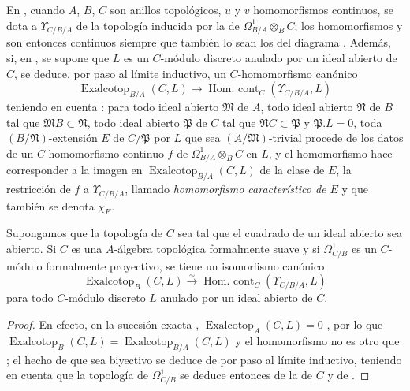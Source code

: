 \begin{env}[20.7.10]
\label{0.20.7.10-fr}
En , cuando $A$, $B$, $C$ son anillos topológicos,
$u$ y $v$ homomorfismos continuos, se dota a $\Upsilon_{C/B/A}$ de la
topología inducida por la de $\Omega^1_{B/A}\otimes_B C$; los
homomorfismos  y  son entonces
continuos siempre que también lo sean los del diagrama
. Además, si, en , se supone que
$L$ es un $C$-módulo discreto anulado por un ideal abierto de $C$, se deduce,
por paso al límite inductivo, un $C$-homomorfismo canónico
\begin{equation}
\tag{20.7.10.1}
\label{0.20.7.10.1-fr}
  \operatorname{Exalcotop}_{B/A}(C,L)\to
  \operatorname{Hom.\ cont}_C(\Upsilon_{C/B/A},L)
\end{equation}
teniendo en cuenta : para todo ideal abierto
$\mathfrak{M}$ de $A$, todo ideal abierto $\mathfrak{N}$ de $B$ tal que
$\mathfrak{M}B\subset\mathfrak{N}$, todo ideal abierto $\mathfrak{P}$ de $C$
tal que $\mathfrak{N}C\subset\mathfrak{P}$ y $\mathfrak{P}.L=0$, toda
$(B/\mathfrak{N})$-extensión $E$ de $C/\mathfrak{P}$ por $L$ que sea
$(A/\mathfrak{M})$-trivial procede de los datos de un $C$-homomorfismo
continuo $f$ de $\Omega^1_{B/A}\otimes_B C$ en $L$, y el homomorfismo
 hace corresponder a la imagen en
$\operatorname{Exalcotop}_{B/A}(C,L)$ de la clase de $E$, la restricción de
$f$ a $\Upsilon_{C/B/A}$, llamado \emph{homomorfismo característico de $E$}
y que también se denota $\chi_E$.
\end{env}

\begin{proposition}[20.7.11]
\label{0.20.7.11-fr}
Supongamos que la topología de $C$ sea tal que el cuadrado de un ideal abierto
sea abierto. Si $C$ es una $A$-álgebra topológica formalmente suave y si
$\Omega^1_{C/B}$ es un $C$-módulo formalmente proyectivo, se tiene un
isomorfismo canónico
\begin{equation}
\tag{20.7.11.1}
\label{0.20.7.11.1-fr}
  \operatorname{Exalcotop}_B(C,L)\xrightarrow{\sim}
  \operatorname{Hom.\ cont}_C(\Upsilon_{C/B/A},L)
\end{equation}
para todo $C$-módulo discreto $L$ anulado por un ideal abierto de $C$.
\end{proposition}

\begin{proof}
En efecto, en la sucesión exacta ,
$\operatorname{Exalcotop}_A(C,L)=0$ , por lo que
$\operatorname{Exalcotop}_B(C,L)=\operatorname{Exalcotop}_{B/A}(C,L)$ y
el homomorfismo  no es otro que
; el hecho de que sea biyectivo se deduce de
 por paso al límite inductivo, teniendo en cuenta que
la topología de $\Omega^1_{C/B}$ se deduce entonces de la de $C$
 y de .
\end{proof}

